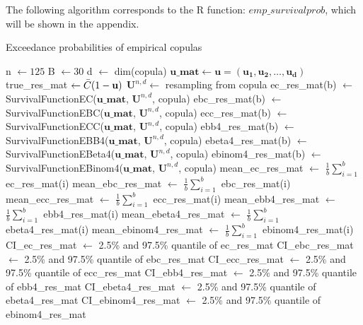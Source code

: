 \documentclass[12pt]{report}
\newcommand{\1}{\mathbf{1}}
\begin{document}
\begin{flushleft}
The following algorithm corresponds to the R function: $emp \_survivalprob$, which will be shown in the appendix.

\begin{algorithm}
\caption{Exceedance probabilities of empirical copulas}
\begin{algorithmic}
 
    \State n $\gets 125$
    \State B $\gets 30$
    \State d $\gets$ dim(copula)
    \State $\mathbf{u\_mat} \gets \mathbf{u} = (\mathbf{u_{1}}, \mathbf{u_{2}}, \dots, \mathbf{u_{d}})$ 
    \State true\_res\_mat $\gets \Bar{C}(1 - \textbf{u})$ 
        \State $\textbf{U}^{n,d} \gets$ resampling from copula 
        \State ec\_res\_mat(b) $\gets$ SurvivalFunctionEC($\mathbf{u\_mat}$, $\textbf{U}^{n,d}$, copula)
        \State ebc\_res\_mat(b) $\gets$ SurvivalFunctionEBC($\mathbf{u\_mat}$, $\textbf{U}^{n,d}$, copula)
        \State ecc\_res\_mat(b) $\gets$ SurvivalFunctionECC($\mathbf{u\_mat}$, $\textbf{U}^{n,d}$, copula)
        \State ebb4\_res\_mat(b) $\gets$ SurvivalFunctionEBB4($\mathbf{u\_mat}$, $\textbf{U}^{n,d}$, copula)
        \State ebeta4\_res\_mat(b) $\gets$ SurvivalFunctionEBeta4($\mathbf{u\_mat}$, $\textbf{U}^{n,d}$, copula)
        \State ebinom4\_res\_mat(b) $\gets$ SurvivalFunctionEBinom4($\mathbf{u\_mat}$, $\textbf{U}^{n,d}$, copula)
    \EndFor
    \State mean\_ec\_res\_mat $\gets$ $\frac{1}{b}\sum\limits_{i = 1}^{b}$ ec\_res\_mat(i)
    \State mean\_ebc\_res\_mat $\gets$ $\frac{1}{b}\sum\limits_{i = 1}^{b}$ ebc\_res\_mat(i)
    \State mean\_ecc\_res\_mat $\gets$ $\frac{1}{b}\sum\limits_{i = 1}^{b}$ ecc\_res\_mat(i)
    \State mean\_ebb4\_res\_mat $\gets$ $\frac{1}{b}\sum\limits_{i = 1}^{b}$ ebb4\_res\_mat(i)
    \State mean\_ebeta4\_res\_mat $\gets$ $\frac{1}{b}\sum\limits_{i = 1}^{b}$ ebeta4\_res\_mat(i)
    \State mean\_ebinom4\_res\_mat $\gets$ $\frac{1}{b}\sum\limits_{i = 1}^{b}$ ebinom4\_res\_mat(i)
    \State CI\_ec\_res\_mat $\gets$ 2.5\% and 97.5\% quantile of ec\_res\_mat
    \State CI\_ebc\_res\_mat $\gets$ 2.5\% and 97.5\% quantile of ebc\_res\_mat
    \State CI\_ecc\_res\_mat $\gets$ 2.5\% and 97.5\% quantile of ecc\_res\_mat
    \State CI\_ebb4\_res\_mat $\gets$ 2.5\% and 97.5\% quantile of ebb4\_res\_mat
    \State CI\_ebeta4\_res\_mat $\gets$ 2.5\% and 97.5\% quantile of ebeta4\_res\_mat
    \State CI\_ebinom4\_res\_mat $\gets$ 2.5\% and 97.5\% quantile of ebinom4\_res\_mat
    

\end{algorithmic}
\end{algorithm}
\end{flushleft}
\end{document}
